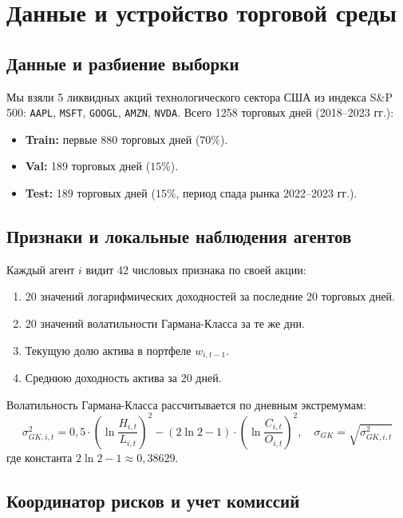 \documentclass[11pt,a4paper]{article}
\begin{document}
\section{Данные и устройство торговой среды}

\subsection{Данные и разбиение выборки}

Мы взяли 5 ликвидных акций технологического сектора США из индекса S\&P 500: \texttt{AAPL}, \texttt{MSFT}, \texttt{GOOGL}, \texttt{AMZN}, \texttt{NVDA}. Всего 1258 торговых дней (2018--2023 гг.):
\begin{itemize}[leftmargin=*]
\item \textbf{Train:} первые 880 торговых дней ($70\%$).
\item \textbf{Val:} 189 торговых дней ($15\%$).
\item \textbf{Test:} 189 торговых дней ($15\%$, период спада рынка 2022--2023 гг.).
\end{itemize}

\subsection{Признаки и локальные наблюдения агентов}

Каждый агент $i$ видит 42 числовых признака по своей акции:
\begin{enumerate}[leftmargin=*]
\item 20 значений логарифмических доходностей за последние 20 торговых дней.
\item 20 значений волатильности Гармана-Класса за те же дни.
\item Текущую долю актива в портфеле $w_{i, t-1}$.
\item Среднюю доходность актива за 20 дней.
\end{enumerate}

Волатильность Гармана-Класса рассчитывается по дневным экстремумам:
$$\sigma_{GK, i, t}^2 = 0{,}5 \cdot \left( \ln \frac{H_{i, t}}{L_{i, t}} \right)^2 - (2\ln 2 - 1) \cdot \left( \ln \frac{C_{i, t}}{O_{i, t}} \right)^2, \quad \sigma_{GK} = \sqrt{\sigma_{GK, i, t}^2}$$
где константа $2\ln 2 - 1 \approx 0{,}38629$.

\subsection{Координатор рисков и учет комиссий}
\end{document}
